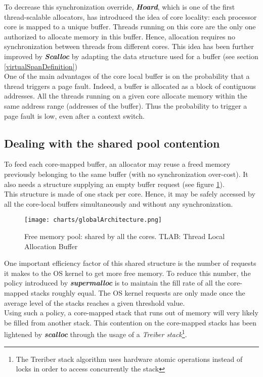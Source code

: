 \documentclass[10pt]{article}											%
\begin{document}
To decrease this synchronization override, \textbf{\textit{Hoard}}\cite{hoard_berger}, which is one of the first thread-scalable allocators, has introduced the idea of core locality:  each processor core is mapped to a unique buffer. Threads running on this core are the only one authorized to allocate memory in this buffer. Hence, allocation requires no synchronization between threads from different cores.   This idea has been further improved by \textbf{\textit{Scalloc}}\cite{scalloc_aigner} by adapting the data structure used for a buffer (see section \ref{virtualSpanDefinition})\\

One of the main advantages of the core local buffer is on the probability that a thread triggers a page fault.   Indeed, a buffer is allocated as a block of contiguous addresses.   All the threads running on a given core allocate memory within the same address range (addresses of the buffer).   Thus the probability to trigger a page fault is low, even after a context switch.



\subsection{Dealing with the shared pool contention}
To feed each core-mapped buffer, an allocator may reuse a freed memory previously belonging to the same buffer (with no synchronization over-cost).   It also needs a structure supplying an empty buffer request (see figure \ref{globalArchitecture.png}).\\
This structure is made of one stack per core.  Hence, it may be safely accessed by all the core-local buffers simultaneously and without any synchronization.\\

\begin{figure}[H]
    \centering
    \texttt{[image: charts/globalArchitecture.png]}
    \caption[Caption for FN]{Free memory pool: shared by all the cores. TLAB: Thread Local Allocation Buffer}
    \label{globalArchitecture.png}
\end{figure}

One important efficiency factor of this shared structure is the number of requests it makes to the OS kernel to get more free memory.   To reduce this number, the policy introduced by \textbf{\textit{supermalloc}}\cite{supermalloc_kuszmaul} is to maintain the fill rate of all the core-mapped stacks roughly equal.   The OS kernel requests are only made once the average level of the stacks reaches a given threshold value.\\
Using such a policy, a core-mapped stack that runs out of memory will very likely be filled from another stack.  This contention on the core-mapped stacks has been lightened by \textbf{\textit{scalloc}}\cite{scalloc_aigner} through the usage of a \textit{Treiber stack}\footnote{The Treriber stack algorithm uses hardware atomic operations instead of locks in order to access concurrently the stack}.\\
\end{document}
